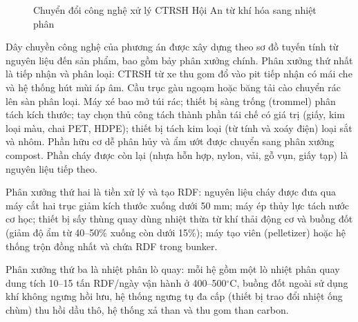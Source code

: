 \documentclass[../main.tex]{subfiles}
\begin{document}
\begin{figure}[htbp]
{
    }
    \caption{Chuyển đổi công nghệ xử lý CTRSH Hội An từ khí hóa sang nhiệt phân}
    \label{fig:so-sanh-cong-nghe}
\end{figure}

Dây chuyền công nghệ của phương án được xây dựng theo sơ đồ tuyến tính từ nguyên liệu đến sản phẩm, bao gồm bảy phân xưởng chính. Phân xưởng thứ nhất là tiếp nhận và phân loại: CTRSH từ xe thu gom đổ vào pit tiếp nhận có mái che và hệ thống hút mùi áp âm. Cầu trục gàu ngoạm hoặc băng tải cào chuyển rác lên sàn phân loại. Máy xé bao mở túi rác; thiết bị sàng trống (trommel) phân tách kích thước; tay chọn thủ công tách thành phần tái chế có giá trị (giấy, kim loại màu, chai PET, HDPE); thiết bị tách kim loại (từ tính và xoáy điện) loại sắt và nhôm. Phần hữu cơ dễ phân hủy và ẩm ướt được chuyển sang phân xưởng compost. Phần cháy được còn lại (nhựa hỗn hợp, nylon, vải, gỗ vụn, giấy tạp) là nguyên liệu tiếp theo.

Phân xưởng thứ hai là tiền xử lý và tạo RDF: nguyên liệu cháy được đưa qua máy cắt hai trục giảm kích thước xuống dưới 50 mm; máy ép thủy lực tách nước cơ học; thiết bị sấy thùng quay dùng nhiệt thừa từ khí thải động cơ và buồng đốt (giảm độ ẩm từ 40--50\% xuống còn dưới 15\%); máy tạo viên (pelletizer) hoặc hệ thống trộn đồng nhất và chứa RDF trong bunker.

Phân xưởng thứ ba là nhiệt phân lò quay: mỗi hệ gồm một lò nhiệt phân quay dung tích 10--15 tấn RDF/ngày vận hành ở 400--500$^\circ\mathrm{C}$, buồng đốt ngoài sử dụng khí không ngưng hồi lưu, hệ thống ngưng tụ đa cấp (thiết bị trao đổi nhiệt ống chùm) thu hồi dầu thô, hệ thống xả than và thu gom than carbon.
\end{document}
